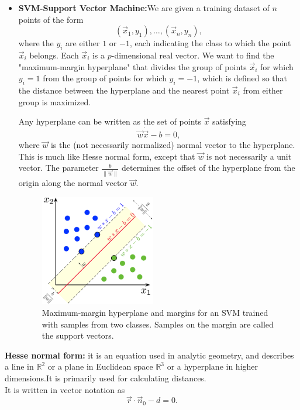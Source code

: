 \documentclass[12pt]{article}
\begin{document}
{\begin{itemize}
$${\begin{aligned}\log p(C_{k}\mid \mathbf {x} )&\varpropto \log \left(p(C_{k})\prod _{i=1}^{n}{p_{ki}}^{x_{i}}\right)\\&=\log p(C_{k})+\sum _{i=1}^{n}x_{i}\cdot \log p_{ki}\\&=b+\mathbf {w} _{k}^{\top }\mathbf {x} \end{aligned}}$$
where $b=\log p(C_{k})$ and $w_{{ki}}=\log p_{{ki}}$.
    \item \textbf{SVM-Support Vector Machine:}We are given a training dataset of $n$ points of the form
    $$ ({\vec {x}}_{1},y_{1}),\ldots ,({\vec {x}}_{n},y_{n}),$$ 
    where the $y_{i}$ are either $1$ or $-1$, each indicating the class to which the point ${\vec {x}}_{i}$ belongs. Each ${\vec {x}}_{i}$ is a $p$-dimensional real vector. We want to find the "maximum-margin hyperplane" that divides the group of points ${\vec {x}}_{i}$ for which $ y_{i}=1$ from the group of points for which $y_{i}=-1$, which is defined so that the distance between the hyperplane and the nearest point ${\vec {x}}_{i}$ from either group is maximized.\par
    Any hyperplane can be written as the set of points ${\vec {x}}$ satisfying
    $${\vec {w}}\dot {\vec {x}}-b=0,$$
    where ${\vec {w}}$ is the (not necessarily normalized) normal vector to the hyperplane. This is much like Hesse normal form, except that ${\vec {w}}$ is not necessarily a unit vector. The parameter ${\frac {b}{\|{\vec {w}}\|}}$ determines the offset of the hyperplane from the origin along the normal vector ${\vec {w}}$.
    \begin{figure}[h!]
      \begin{center}
      \includegraphics[width=50mm]{SVM_margin.png}
      \caption{Maximum-margin hyperplane and margins for an SVM trained with samples from two classes. Samples on the margin are called the support vectors.}
      \label{fig:}
      \end{center}
    \end{figure}
\end{itemize}
\textbf{Hesse normal form:} it is an equation used in analytic geometry, and describes a line in $\mathbb {R} ^{2}$ or a plane in Euclidean space $\mathbb {R} ^{3}$ or a hyperplane in higher dimensions.It is primarily used for calculating distances.\\
It is written in vector notation as
$${\vec  r}\cdot {\vec  n}_{0}-d=0.$$
}
 
\end{document}
